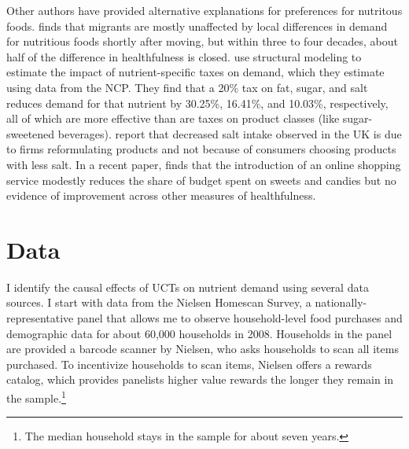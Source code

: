 \documentclass[12pt]{article}
\begin{document}
Other authors have provided alternative explanations for preferences for nutritous foods. \textcite{hut2020determinants} finds that migrants are mostly unaffected by local differences in demand for nutritious foods shortly after moving, but within three to four decades, about half of the difference in healthfulness is closed. \textcite{harding2017effect} use structural modeling to estimate the impact of nutrient-specific taxes on demand, which they estimate using data from the NCP. They find that a 20\% tax on fat, sugar, and salt reduces demand for that nutrient by 30.25\%, 16.41\%, and 10.03\%, respectively, all of which are more effective than are taxes on product classes (like sugar-sweetened beverages). \textcite{griffith2017importance} report that decreased salt intake observed in the UK is due to firms reformulating products and not because of consumers choosing products with less salt. In a recent paper, \textcite{harris2020online} finds that the introduction of an online shopping service modestly reduces the share of budget spent on sweets and candies but no evidence of improvement across other measures of healthfulness.

\section{Data} \label{data}

I identify the causal effects of UCTs on nutrient demand using several data sources. I start with data from the Nielsen Homescan Survey, a nationally-representative panel that allows me to observe household-level food purchases and demographic data for about 60,000 households in 2008. Households in the panel are provided a barcode scanner by Nielsen, who asks households to scan all items purchased. To incentivize households to scan items, Nielsen offers a rewards catalog, which provides panelists higher value rewards the longer they remain in the sample.\footnote{The median household stays in the sample for about seven years.}
\end{document}
